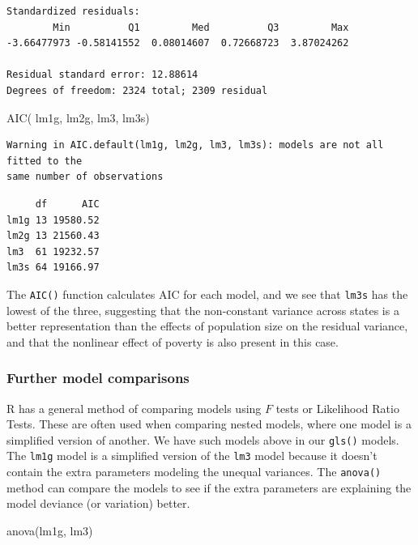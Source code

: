 \documentclass[
  letterpaper,
  DIV=11,
  numbers=noendperiod]{scrreprt}
\newenvironment{Shaded}{\begin{snugshade}}{\end{snugshade}}
\newcommand{\FunctionTok}[1]{\textcolor[rgb]{0.28,0.35,0.67}{#1}}
\newcommand{\NormalTok}[1]{\textcolor[rgb]{0.00,0.23,0.31}{#1}}
\begin{document}
\begin{verbatim}
Standardized residuals:
        Min          Q1         Med          Q3         Max 
-3.66477973 -0.58141552  0.08014607  0.72668723  3.87024262 

Residual standard error: 12.88614 
Degrees of freedom: 2324 total; 2309 residual
\end{verbatim}

\begin{Shaded}
\begin{Highlighting}[]
\FunctionTok{AIC}\NormalTok{( lm1g,  lm2g, lm3, lm3s)}
\end{Highlighting}
\end{Shaded}

\begin{verbatim}
Warning in AIC.default(lm1g, lm2g, lm3, lm3s): models are not all fitted to the
same number of observations
\end{verbatim}

\begin{verbatim}
     df      AIC
lm1g 13 19580.52
lm2g 13 21560.43
lm3  61 19232.57
lm3s 64 19166.97
\end{verbatim}

The \texttt{AIC()} function calculates AIC for each model, and we see
that \texttt{lm3s} has the lowest of the three, suggesting that the
non-constant variance across states is a better representation than the
effects of population size on the residual variance, and that the
nonlinear effect of poverty is also present in this case.

\hypertarget{further-model-comparisons}{%
\subsubsection{Further model
comparisons}\label{further-model-comparisons}}

R has a general method of comparing models using \(F\) tests or
Likelihood Ratio Tests. These are often used when comparing nested
models, where one model is a simplified version of another. We have such
models above in our \texttt{gls()} models. The \texttt{lm1g} model is a
simplified version of the \texttt{lm3} model because it doesn't contain
the extra parameters modeling the unequal variances. The
\texttt{anova()} method can compare the models to see if the extra
parameters are explaining the model deviance (or variation) better.

\begin{Shaded}
\begin{Highlighting}[]
\FunctionTok{anova}\NormalTok{(lm1g, lm3)}
\end{Highlighting}
\end{Shaded}
\end{document}
